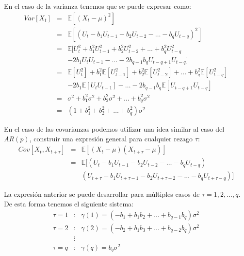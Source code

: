 \documentclass[
]{book}
\begin{document}
En el caso de la varianza tenemos que se puede expresar como:
\begin{eqnarray}
    Var[X_t] & = & \mathbb{E}[(X_t - \mu)^2] \nonumber \\
    & = & \mathbb{E}[(U_t - b_1 U_{t-1} - b_2 U_{t-2} - \ldots - b_q U_{t-q})^2] \nonumber \\
    & = & \mathbb{E}[U_t^2 + b_1^2 U_{t-1}^2 + b_2^2 U_{t-2}^2 + \ldots + b_q^2 U_{t-q}^2 \nonumber \\
    &   & - 2 b_1 U_t U_{t - 1} - \ldots - 2 b_{q - 1} b_q U_{t - q + 1} U_{t - q}] \nonumber \\
    & = & \mathbb{E}[U_t^2] + b_1^2 \mathbb{E}[U_{t-1}^2] + b_2^2 \mathbb{E}[U_{t-2}^2] + \ldots + b_q^2 \mathbb{E}[U_{t-q}^2] \nonumber \\
    &   & - 2 b_1 \mathbb{E}[U_t U_{t - 1}] - \ldots - 2 b_{q - 1} b_q \mathbb{E}[U_{t - q + 1} U_{t - q}] \nonumber \\
    & = & \sigma^2 + b^2_1 \sigma^2 + b^2_2 \sigma^2 + \ldots + b^2_q \sigma^2 \nonumber \\
    & = & (1 + b^2_1 + b^2_2 + \ldots + b^2_q) \sigma^2
\end{eqnarray}

En el caso de las covarianzas podemos utilizar una idea similar al caso del \(AR(p)\), construir una expresión general para cualquier rezago \(\tau\):
\begin{eqnarray}
    Cov[X_t, X_{t + \tau}] & = & \mathbb{E}[(X_t - \mu)(X_{t + \tau} - \mu)] \nonumber \\
    & = & \mathbb{E}[(U_t - b_1 U_{t-1} - b_2 U_{t-2} - \ldots - b_q U_{t-q}) \nonumber \\
    &   & (U_{t + \tau} - b_1 U_{t + \tau -1} - b_2 U_{t + \tau -2} - \ldots - b_q U_{t + \tau - q})] \nonumber
\end{eqnarray}

La expresión anterior se puede desarrollar para múltiples casos de \(\tau = 1, 2, \ldots, q\). De esta forma tenemos el siguiente sistema:
\begin{eqnarray}
    \tau = 1 & : & \gamma(1) = (- b_1 + b_1 b_2 + \ldots + b_{q-1} b_q) \sigma^2 \nonumber \\
    \tau = 2 & : & \gamma(2) = (- b_2 + b_1 b_3 + \ldots + b_{q-2} b_q) \sigma^2 \nonumber \\
    & \vdots & \nonumber \\
    \tau = q & : & \gamma(q) = b_q \sigma^2 \nonumber
\end{eqnarray}
\end{document}
